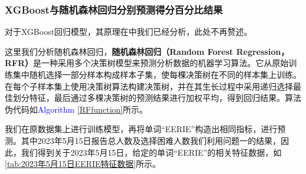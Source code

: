 \documentclass{MathModeling}
\begin{document}
	\subsubsection{XGBoost与随机森林回归分别预测得分百分比结果}
	对于XGBoost回归模型，其原理在\textcolor{blue}{}中我们已经分析，此处不再赘述。
	
	这里我们分析随机森林回归，\textbf{随机森林回归（Random Forest Regression，RFR）}是一种采用多个决策树模型来预测分析数据的机器学习算法。它从原始训练集中随机选择一部分样本构成样本子集，使每棵决策树在不同的样本集上训练。在每个子样本集上使用决策树算法构建决策树，并在其生长过程中采用递归选择最佳划分特征，最后通过多棵决策树的预测结果进行加权平均，得到回归结果。算法伪代码如\textcolor{blue}{Algorithm \ref{RFfunction}}所示。


	我们在原数据集上进行训练模型，再将单词“EERIE”构造出相同指标，进行预测。其中2023年5月15日报告总人数及选择困难人数我们利用问题一的结果，因此，我们得到关于2023年5月15日，给定的单词“EERIE”的相关特征数据，如\textcolor{blue}{\cref{tab:2023年5月15日EERIE特征数据}}所示。
\end{document}
